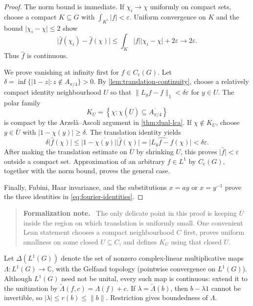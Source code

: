 \documentclass[11pt]{article}
\theoremstyle{definition}
\theoremstyle{remark}
\newcommand{\C}{\mathbb C}
\newcommand{\Cc}{C_{\mathrm c}}
\newcommand{\Lp}[1]{L^{#1}}
\newcommand{\abs}[1]{\lvert #1\rvert}
\newcommand{\norm}[1]{\lVert #1\rVert}
\newcommand{\set}[1]{\left\{#1\right\}}
\newenvironment{formalization}
  {\begin{quote}\small\noindent\textbf{Formalization note.}\ }
  {\end{quote}}
\begin{document}
\begin{proof}
The norm bound is immediate.  If $\chi_i\to\chi$ uniformly on compact sets, choose a
compact $K\subseteq G$ with $\int_{K^c}\abs f<\varepsilon$.  Uniform convergence on
$K$ and the bound $\abs{\chi_i-\chi}\leq2$ show
\[
 \abs{\widehat f(\chi_i)-\widehat f(\chi)}
 \leq\int_K\abs f\abs{\chi_i-\chi}+2\varepsilon\longrightarrow2\varepsilon.
\]
Thus $\widehat f$ is continuous.

We prove vanishing at infinity first for $f\in\Cc(G)$.  Let
$\delta=\inf\{\abs{1-z}:z\notin A_{\pi/4}\}>0$.  By
\cref{lem:translation-continuity}, choose a relatively compact identity neighbourhood
$U$ so that $\norm{L_yf-f}_1<\delta\varepsilon$ for $y\in U$.  The polar family
\[
 K_U=\set{\chi:\chi(\overline U)\subseteq\overline{A_{\pi/4}}}
\]
is compact by the Arzel\`a--Ascoli argument in \cref{thm:dual-lca}.  If
$\chi\notin K_U$, choose $y\in\overline U$ with
$\abs{1-\chi(y)}\geq\delta$.  The translation identity yields
\[
 \delta\abs{\widehat f(\chi)}
 \leq\abs{1-\overline{\chi(y)}}\abs{\widehat f(\chi)}
 =\abs{\widehat{L_yf-f}(\chi)}<\delta\varepsilon.
\]
After making the translation estimate on $\overline U$ by shrinking $U$, this proves
$\abs{\widehat f}<\varepsilon$ outside a compact set.  Approximation of an arbitrary
$f\in\Lp1$ by $\Cc(G)$, together with the norm bound, proves the general case.

Finally, Fubini, Haar invariance, and the substitutions $x=ay$ or $x=y^{-1}$ prove the
three identities in \eqref{eq:fourier-identities}.
\end{proof}

\begin{formalization}
The only delicate point in this proof is keeping $\overline U$ inside the region on which
translation is uniformly small.  One convenient Lean statement chooses a compact
neighbourhood $C$ first, proves uniform smallness on some closed $U\subseteq C$, and
defines $K_U$ using that closed $U$.
\end{formalization}

Let $\Delta(\Lp1(G))$ denote the set of nonzero complex-linear multiplicative maps
$\Lambda:\Lp1(G)\to\C$, with the Gelfand topology (pointwise convergence on
$\Lp1(G)$).  Although $\Lp1(G)$ need not be unital, every such map is continuous:
extend it to the unitization by $\widetilde\Lambda(f,c)=\Lambda(f)+c$.  If
$\lambda=\widetilde\Lambda(b)$, then $b-\lambda1$ cannot be invertible, so
$\abs\lambda\leq r(b)\leq\norm b$.  Restriction gives boundedness of $\Lambda$.
\end{document}
